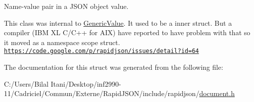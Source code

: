 Name-\/value pair in a J\+S\+ON object value. 

This class was internal to \hyperlink{class_generic_value}{Generic\+Value}. It used to be a inner struct. But a compiler (I\+BM XL C/\+C++ for A\+IX) have reported to have problem with that so it moved as a namespace scope struct. \href{https://code.google.com/p/rapidjson/issues/detail?id=64}{\tt https\+://code.\+google.\+com/p/rapidjson/issues/detail?id=64} 

The documentation for this struct was generated from the following file\+:\begin{DoxyCompactItemize}
\item 
C\+:/\+Users/\+Bilal Itani/\+Desktop/inf2990-\/11/\+Cadriciel/\+Commun/\+Externe/\+Rapid\+J\+S\+O\+N/include/rapidjson/\hyperlink{document_8h}{document.\+h}\end{DoxyCompactItemize}
